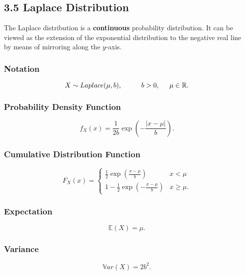 \documentclass[11pt]{article}
\begin{document}
\subsection*{3.5 Laplace Distribution}
The Laplace distribution is a \textbf{continuous} probability distribution. It can be viewed as the extension of the exponential distribution to the negative real line by means of mirroring along the $y$-axis. 

\subsubsection*{Notation}
\begin{equation}
    X \sim Laplace(\mu, b), \hspace{1cm} b>0, \hspace{0.5cm} \mu \in \mathbb{R}.
\end{equation}

\subsubsection*{Probability Density Function}
\begin{equation}
    f_X(x) = \frac{1}{2b} \exp \left( -\frac{| x - \mu|}{b}\right).
\end{equation}

\subsubsection*{Cumulative Distribution Function}
\begin{equation}
    F_X(x) = 
    \begin{cases} 
        \frac{1}{2} \exp \left( \frac{x- \mu}{b} \right) & x < \mu \\
        1 - \frac{1}{2} \exp \left( -\frac{x- \mu}{b} \right) & x \geq \mu.
   \end{cases}
\end{equation}

\subsubsection*{Expectation}
\begin{equation}
    \mathbb{E}(X) = \mu.
\end{equation}

\subsubsection*{Variance}
\begin{equation}
    \mathbb{V}ar(X) = 2b^2.
\end{equation}
\end{document}
